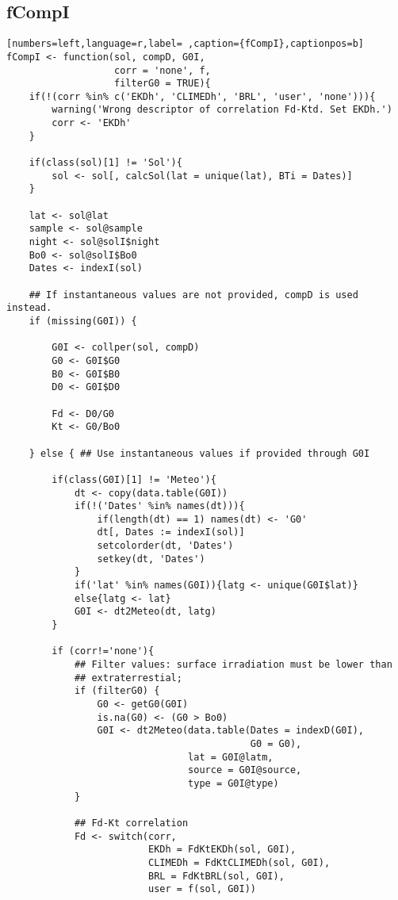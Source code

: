 \subsection{fCompI}
\label{sec:orge34ba3c}
\label{subsec:fcompi}
\begin{lstlisting}[numbers=left,language=r,label= ,caption={fCompI},captionpos=b]
fCompI <- function(sol, compD, G0I,
                   corr = 'none', f,
                   filterG0 = TRUE){
    if(!(corr %in% c('EKDh', 'CLIMEDh', 'BRL', 'user', 'none'))){
        warning('Wrong descriptor of correlation Fd-Ktd. Set EKDh.')
        corr <- 'EKDh'
    }

    if(class(sol)[1] != 'Sol'){
        sol <- sol[, calcSol(lat = unique(lat), BTi = Dates)]
    }

    lat <- sol@lat
    sample <- sol@sample
    night <- sol@solI$night
    Bo0 <- sol@solI$Bo0
    Dates <- indexI(sol)

    ## If instantaneous values are not provided, compD is used instead.
    if (missing(G0I)) { 

        G0I <- collper(sol, compD)
        G0 <- G0I$G0
        B0 <- G0I$B0
        D0 <- G0I$D0

        Fd <- D0/G0
        Kt <- G0/Bo0

    } else { ## Use instantaneous values if provided through G0I

        if(class(G0I)[1] != 'Meteo'){
            dt <- copy(data.table(G0I))
            if(!('Dates' %in% names(dt))){
                if(length(dt) == 1) names(dt) <- 'G0'
                dt[, Dates := indexI(sol)]
                setcolorder(dt, 'Dates')
                setkey(dt, 'Dates')
            }
            if('lat' %in% names(G0I)){latg <- unique(G0I$lat)}
            else{latg <- lat}
            G0I <- dt2Meteo(dt, latg)
        }

        if (corr!='none'){
            ## Filter values: surface irradiation must be lower than
            ## extraterrestial; 
            if (filterG0) {
                G0 <- getG0(G0I)
                is.na(G0) <- (G0 > Bo0)
                G0I <- dt2Meteo(data.table(Dates = indexD(G0I),
                                           G0 = G0),
                                lat = G0I@latm,
                                source = G0I@source,
                                type = G0I@type)
            }

            ## Fd-Kt correlation
            Fd <- switch(corr,
                         EKDh = FdKtEKDh(sol, G0I),
                         CLIMEDh = FdKtCLIMEDh(sol, G0I),
                         BRL = FdKtBRL(sol, G0I), 
                         user = f(sol, G0I))


\end{lstlisting}
